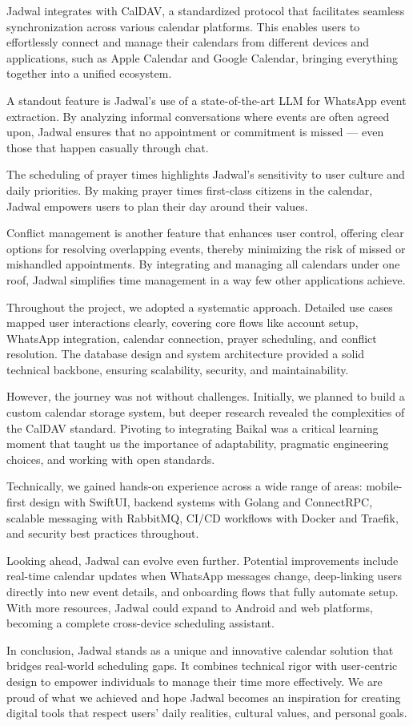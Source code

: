 \documentclass[12pt,a4paper,twoside]{report}
\begin{document}
Jadwal integrates with CalDAV, a standardized protocol that facilitates seamless synchronization across various calendar platforms. This enables users to effortlessly connect and manage their calendars from different devices and applications, such as Apple Calendar and Google Calendar, bringing everything together into a unified ecosystem.

A standout feature is Jadwal's use of a state-of-the-art LLM for WhatsApp event extraction. By analyzing informal conversations where events are often agreed upon, Jadwal ensures that no appointment or commitment is missed — even those that happen casually through chat.

The scheduling of prayer times highlights Jadwal's sensitivity to user culture and daily priorities. By making prayer times first-class citizens in the calendar, Jadwal empowers users to plan their day around their values.

Conflict management is another feature that enhances user control, offering clear options for resolving overlapping events, thereby minimizing the risk of missed or mishandled appointments. By integrating and managing all calendars under one roof, Jadwal simplifies time management in a way few other applications achieve.

Throughout the project, we adopted a systematic approach. Detailed use cases mapped user interactions clearly, covering core flows like account setup, WhatsApp integration, calendar connection, prayer scheduling, and conflict resolution. The database design and system architecture provided a solid technical backbone, ensuring scalability, security, and maintainability.

However, the journey was not without challenges. Initially, we planned to build a custom calendar storage system, but deeper research revealed the complexities of the CalDAV standard. Pivoting to integrating Baikal was a critical learning moment that taught us the importance of adaptability, pragmatic engineering choices, and working with open standards.

Technically, we gained hands-on experience across a wide range of areas: mobile-first design with SwiftUI, backend systems with Golang and ConnectRPC, scalable messaging with RabbitMQ, CI/CD workflows with Docker and Traefik, and security best practices throughout.

Looking ahead, Jadwal can evolve even further. Potential improvements include real-time calendar updates when WhatsApp messages change, deep-linking users directly into new event details, and onboarding flows that fully automate setup. With more resources, Jadwal could expand to Android and web platforms, becoming a complete cross-device scheduling assistant.

In conclusion, Jadwal stands as a unique and innovative calendar solution that bridges real-world scheduling gaps. It combines technical rigor with user-centric design to empower individuals to manage their time more effectively. We are proud of what we achieved and hope Jadwal becomes an inspiration for creating digital tools that respect users' daily realities, cultural values, and personal goals.



\end{document}
